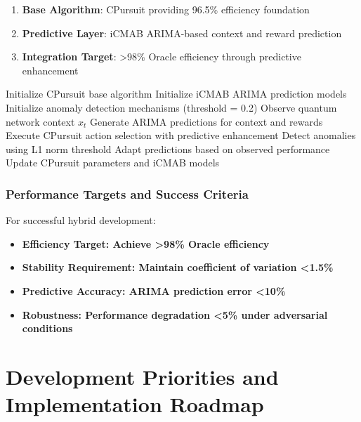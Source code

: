 \documentclass[12pt,a4paper]{article}
\newcommand{\hybrid}[1]{\textcolor{hybridcolor}{\textbf{#1}}}
\begin{document}
\begin{enumerate}
\item \textbf{Base Algorithm}: CPursuit providing 96.5\% efficiency foundation
\item \textbf{Predictive Layer}: iCMAB ARIMA-based context and reward prediction
\item \textbf{Integration Target}: >98\% Oracle efficiency through predictive enhancement
\end{enumerate}

\begin{algorithm}
\caption{CPursuit-Enhanced iCMAB Hybrid Framework}
\begin{algorithmic}[1]
\STATE Initialize CPursuit base algorithm
\STATE Initialize iCMAB ARIMA prediction models
\STATE Initialize anomaly detection mechanisms (threshold = 0.2)
    \STATE Observe quantum network context $x_t$
    \STATE Generate ARIMA predictions for context and rewards
    \STATE Execute CPursuit action selection with predictive enhancement
    \STATE Detect anomalies using L1 norm threshold
    \STATE Adapt predictions based on observed performance
    \STATE Update CPursuit parameters and iCMAB models
\ENDFOR
\end{algorithmic}
\end{algorithm}

\subsubsection{Performance Targets and Success Criteria}

For successful hybrid development:

\begin{itemize}
\item \hybrid{\textbf{Efficiency Target}: Achieve >98\% Oracle efficiency}
\item \hybrid{\textbf{Stability Requirement}: Maintain coefficient of variation <1.5\%}
\item \hybrid{\textbf{Predictive Accuracy}: ARIMA prediction error <10\%}
\item \hybrid{\textbf{Robustness}: Performance degradation <5\% under adversarial conditions}
\end{itemize}

\section{Development Priorities and Implementation Roadmap}
\end{document}
